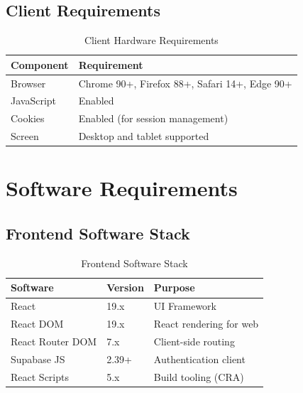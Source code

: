         \subsection{Client Requirements}
        \begin{table}[H]
        \centering
        \begin{tabular}{|l|l|}
        \hline
        \textbf{Component} & \textbf{Requirement} \\
        \hline
        Browser & Chrome 90+, Firefox 88+, Safari 14+, Edge 90+ \\
        JavaScript & Enabled \\
        Cookies & Enabled (for session management) \\
        Screen & Desktop and tablet supported \\
        \hline
        \end{tabular}
        \caption{Client Hardware Requirements}
        \end{table}

        \section{Software Requirements}

        \subsection{Frontend Software Stack}
        \begin{table}[H]
        \centering
        \begin{tabular}{|l|l|l|}
        \hline
        \textbf{Software} & \textbf{Version} & \textbf{Purpose} \\
        \hline
        React & 19.x & UI Framework \\
        React DOM & 19.x & React rendering for web \\
        React Router DOM & 7.x & Client-side routing \\
        Supabase JS & 2.39+ & Authentication client \\
        React Scripts & 5.x & Build tooling (CRA) \\
        \hline
        \end{tabular}
        \caption{Frontend Software Stack}
        \end{table}


